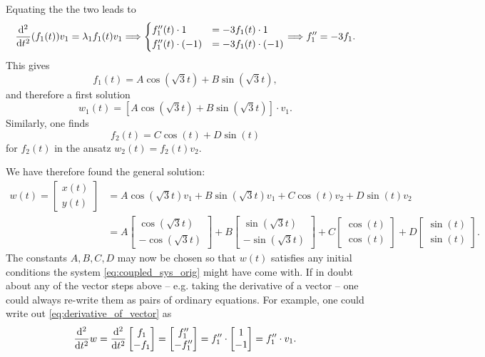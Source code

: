 \begin{application}
\begin{equation}
\end{equation}
Equating the the two leads to
\[ \displaystyle{\frac{\mathrm{d}^2 }{\mathrm{d}t^2}} (f_1(t))v_1 = \lambda_1 f_1(t) v_1 \Longrightarrow
\begin{cases}
f_1''(t) \cdot 1 & = -3 f_1(t) \cdot 1 \\
f_1''(t) \cdot (-1) & = -3 f_1(t) \cdot (-1) 
\end{cases} \Longrightarrow f_1'' = -3 f_1. \]
This gives
\[ f_1(t) = A\cos\left(\sqrt{3}t\right) + B\sin\left(\sqrt{3}t\right), \]
and therefore a first solution
\[ w_1(t) = \left[ A\cos\left(\sqrt{3}t\right) + B\sin\left(\sqrt{3}t\right)\right] \cdot v_1. \]
Similarly, one finds
\[ f_2(t) = C\cos\left(t\right) + D\sin\left(t\right)\]
for $f_2(t)$ in the ansatz $w_2(t) = f_2(t)v_2$.

We have therefore found the general solution:
\begin{equation}
\label{eq:coupled_sys_sol}
\begin{split}
w(t) = \begin{bmatrix} x(t) \\ y(t) \end{bmatrix} & = 
A\cos\left(\sqrt{3}t\right)v_1 + B\sin\left(\sqrt{3}t\right)v_1 + C\cos\left(t\right)v_2 + D\sin\left(t\right)v_2 \\
& = A \begin{bmatrix}
\cos(\sqrt{3}t) \\ -\cos(\sqrt{3}t)
\end{bmatrix} + B \begin{bmatrix}
\sin(\sqrt{3}t) \\ -\sin(\sqrt{3}t)
\end{bmatrix} + C \begin{bmatrix}
\cos(t) \\ \cos(t)
\end{bmatrix} + D \begin{bmatrix}
\sin(t) \\ \sin(t)
\end{bmatrix}.
\end{split}
\end{equation}
The constants $A,B,C,D$ may now be chosen so that $w(t)$ satisfies any initial conditions the system \eqref{eq:coupled_sys_orig} might have come with. If in doubt about any of the vector steps above -- e.g. taking the derivative of a vector -- one could always re-write them as pairs of ordinary equations. For example, one could write out \eqref{eq:derivative_of_vector} as
\[  \displaystyle{\frac{\mathrm{d}^2 }{\mathrm{d}t^2}} w = \displaystyle{\frac{\mathrm{d}^2 }{\mathrm{d}t^2}} \begin{bmatrix} f_1 \\ -f_1 \end{bmatrix} 
= \begin{bmatrix} f''_1 \\ -f''_1 \end{bmatrix}
= f''_1 \cdot \begin{bmatrix} 1 \\ -1 \end{bmatrix} = f''_1 \cdot v_1. \]
\end{application}

